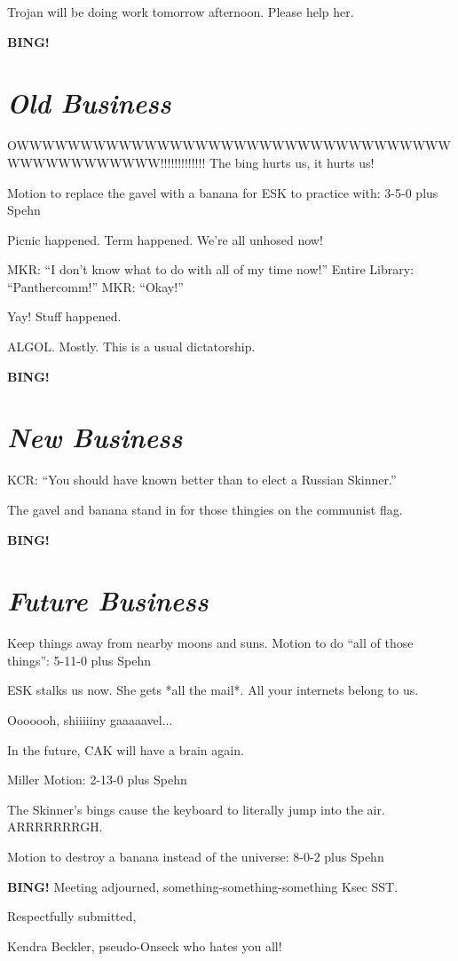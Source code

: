 \documentclass[10pt]{article}
\newcommand{\bing}{{\bf BING!} }
\newcommand{\goto}[1]{\bing \vskip 12pt \section*{{\em{#1}}}}
\newcommand{\ps}{ plus Spehn\xspace}
\begin{document}
Trojan will be doing work tomorrow afternoon.  Please help her.

\goto{Old Business}

OWWWWWWWWWWWWWWWWWWWWWWWWWWWWWWWWWWWWWWWWWWWWWW!!!!!!!!!!!!!  The bing hurts us, it hurts us!

Motion to replace the gavel with a banana for ESK to practice with: 3-5-0 \ps

Picnic happened.  Term happened.  We're all unhosed now!

MKR: ``I don't know what to do with all of my time now!''
Entire Library: ``Panthercomm!''
MKR: ``Okay!''

Yay!  Stuff happened.

ALGOL.  Mostly.  This is a usual dictatorship.

\goto{New Business}

KCR: ``You should have known better than to elect a Russian Skinner.''

The gavel and banana stand in for those thingies on the communist flag.

\goto{Future Business}

Keep things away from nearby moons and suns.  Motion to do ``all of those things'': 5-11-0 \ps

ESK stalks us now.  She gets *all the mail*.  All your internets belong to us.

Ooooooh, shiiiiiny gaaaaavel...

In the future, CAK will have a brain again.

Miller Motion: 2-13-0 \ps

The Skinner's bings cause the keyboard to literally jump into the air.  ARRRRRRRGH.

Motion to destroy a banana instead of the universe: 8-0-2 \ps

\bing
\noindent
Meeting adjourned, something-something-something Ksec SST.

\vspace{18pt}

\centerline{Respectfully submitted,}
\centerline{Kendra Beckler, pseudo-Onseck who hates you all!}
\end{document}
